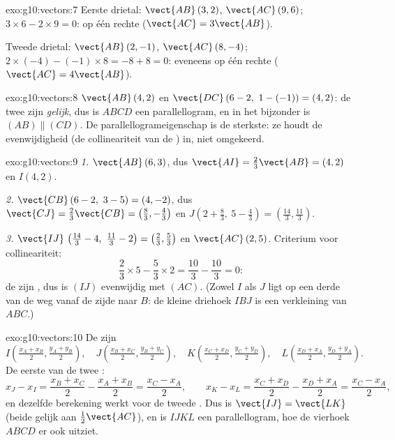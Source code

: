 \begin{solution}{exo:g10:vectors:7}
Eerste drietal: $\vect{AB}\,(3, 2)$, $\vect{AC}\,(9, 6)$;
$3 \times 6 - 2 \times 9 = 0$: op één rechte ($\vect{AC} = 3\vect{AB}$).

Tweede drietal: $\vect{AB}\,(2, -1)$, $\vect{AC}\,(8, -4)$;
$2 \times (-4) - (-1) \times 8 = -8 + 8 = 0$: eveneens op één rechte
($\vect{AC} = 4\vect{AB}$).
\end{solution}

\begin{solution}{exo:g10:vectors:8}
$\vect{AB}\,(4, 2)$ en $\vect{DC}\,(6-2,\ 1-(-1)) = (4, 2)$: de twee
 zijn \emph{gelijk}, dus is $ABCD$ een parallellogram, en in het
bijzonder is $(AB) \parallel (CD)$. De parallellogrameigenschap is de
sterkste: ze houdt de evenwijdigheid (de collineariteit van de ) in,
niet omgekeerd.
\end{solution}

\begin{solution}{exo:g10:vectors:9}
\emph{1.} $\vect{AB}\,(6, 3)$, dus $\vect{AI} = \frac23\vect{AB} = (4, 2)$
en $I(4, 2)$.

\emph{2.} $\vect{CB}\,(6-2,\ 3-5) = (4, -2)$, dus
$\vect{CJ} = \frac23\vect{CB} = \left(\frac83, -\frac43\right)$ en
$J\left(2 + \frac83,\ 5 - \frac43\right) = \left(\frac{14}{3},
\frac{11}{3}\right)$.

\emph{3.} $\vect{IJ}\,\left(\frac{14}{3} - 4,\ \frac{11}{3} - 2\right) =
\left(\frac23, \frac53\right)$ en $\vect{AC}\,(2, 5)$. Criterium voor
collineariteit:
\[
\frac23 \times 5 - \frac53 \times 2 = \frac{10}{3} - \frac{10}{3} = 0 :
\]
de  zijn , dus is $(IJ)$ evenwijdig met $(AC)$. (Zowel $I$
als $J$ ligt op een derde van de weg vanaf de zijde naar $B$: de kleine
driehoek $IBJ$ is een verkleining van $ABC$.)
\end{solution}

\begin{solution}{exo:g10:vectors:10}
De  zijn
\[
I\left(\tfrac{x_A + x_B}{2}, \tfrac{y_A + y_B}{2}\right), \quad
J\left(\tfrac{x_B + x_C}{2}, \tfrac{y_B + y_C}{2}\right), \quad
K\left(\tfrac{x_C + x_D}{2}, \tfrac{y_C + y_D}{2}\right), \quad
L\left(\tfrac{x_D + x_A}{2}, \tfrac{y_D + y_A}{2}\right).
\]
De eerste  van de twee :
\[
x_J - x_I = \frac{x_B + x_C}{2} - \frac{x_A + x_B}{2}
= \frac{x_C - x_A}{2},
\qquad
x_K - x_L = \frac{x_C + x_D}{2} - \frac{x_D + x_A}{2}
= \frac{x_C - x_A}{2},
\]
en dezelfde berekening werkt voor de tweede . Dus is
$\vect{IJ} = \vect{LK}$ (beide gelijk aan $\frac12\vect{AC}$), en is $IJKL$
een parallellogram, hoe de vierhoek $ABCD$ er ook uitziet.
\end{solution}

